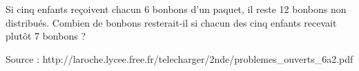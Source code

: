 
Si cinq enfants reçoivent chacun 6 bonbons d'un paquet, il reste 12 bonbons non distribués. Combien de bonbons resterait-il si chacun des cinq enfants recevait plutôt 7 bonbons ? 

\hfill{{\scriptsize Source : http://laroche.lycee.free.fr/telecharger/2nde/problemes\_ouverts\_6a2.pdf}}